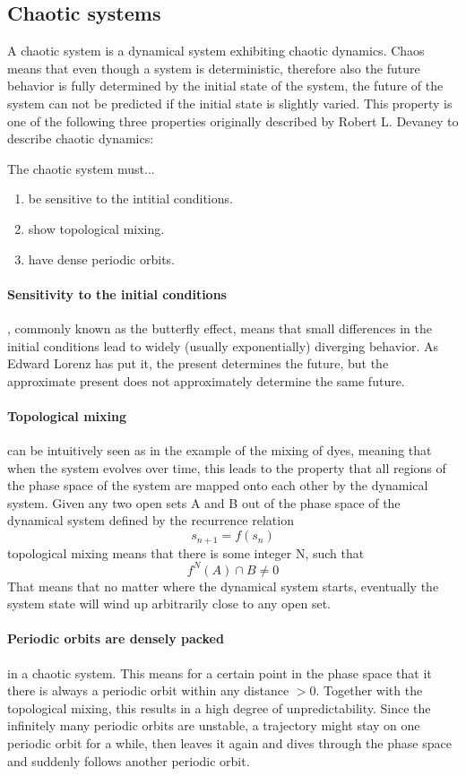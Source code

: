 \documentclass[main]{subfiles}
\begin{document}
\subsection{Chaotic systems}

A chaotic system is a dynamical system exhibiting chaotic dynamics. Chaos means that even though a system is deterministic, therefore also the future behavior is fully determined by the initial state of the system, the future of the system can not be predicted if the initial state is slightly varied. This property is one of the following three properties originally described by Robert L. Devaney \cite{bib:Devaney1989} to describe chaotic dynamics:

The chaotic system must...
\begin{enumerate}
\item be sensitive to the intitial conditions.
\item show topological mixing.
\item have dense periodic orbits.
\end{enumerate}

\paragraph{Sensitivity to the initial conditions}, commonly known as the butterfly effect, means that small differences in the initial conditions lead to widely (usually exponentially) diverging behavior. As Edward Lorenz has put it, the present determines the future, but the approximate present does not approximately determine the same future.

\paragraph{Topological mixing} can be intuitively seen as in the example of the mixing of dyes, meaning that when the system evolves over time, this leads to the property that all regions of the phase space of the system are mapped onto each other by the dynamical system. Given any two open sets A and B out of the phase space of the dynamical system defined by the recurrence relation \[s_{n+1} = f(s_n)\] topological mixing means that there is some integer N, such that \[f^N(A) \cap B \neq 0\] That means that no matter where the dynamical system starts, eventually the system state will wind up arbitrarily close to any open set.

\paragraph{Periodic orbits are densely packed} in a chaotic system. This means for a certain point in the phase space that it there is always a periodic orbit within any distance \(> 0\). Together with the topological mixing, this results in a high degree of unpredictability. Since the infinitely many periodic orbits are unstable, a trajectory might stay on one periodic orbit for a while, then leaves it again and dives through the phase space and suddenly follows another periodic orbit.
\end{document}
